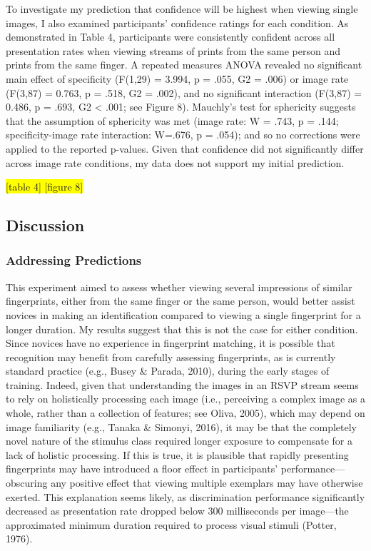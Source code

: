 \documentclass[
  english,
  man]{apa6}
\begin{document}
To investigate my prediction that confidence will be highest when viewing single images, I also examined participants' confidence ratings for each condition. As demonstrated in Table 4, participants were consistently confident across all presentation rates when viewing streams of prints from the same person and prints from the same finger. A repeated measures ANOVA revealed no significant main effect of specificity (F(1,29) = 3.994, p = .055, G2 = .006) or image rate (F(3,87) = 0.763, p = .518, G2 = .002), and no significant interaction (F(3,87) = 0.486, p = .693, G2 \textless{} .001; see Figure 8). Mauchly's test for sphericity suggests that the assumption of sphericity was met (image rate: W = .743, p = .144; specificity-image rate interaction: W=.676, p = .054); and so no corrections were applied to the reported p-values. Given that confidence did not significantly differ across image rate conditions, my data does not support my initial prediction.

\colorbox{yellow}{[table 4]
[figure 8]}

\hypertarget{discussion-1}{%
\subsection{Discussion}\label{discussion-1}}

\hypertarget{addressing-predictions-1}{%
\subsubsection{Addressing Predictions}\label{addressing-predictions-1}}

This experiment aimed to assess whether viewing several impressions of similar fingerprints, either from the same finger or the same person, would better assist novices in making an identification compared to viewing a single fingerprint for a longer duration. My results suggest that this is not the case for either condition. Since novices have no experience in fingerprint matching, it is possible that recognition may benefit from carefully assessing fingerprints, as is currently standard practice (e.g., Busey \& Parada, 2010), during the early stages of training. Indeed, given that understanding the images in an RSVP stream seems to rely on holistically processing each image (i.e., perceiving a complex image as a whole, rather than a collection of features; see Oliva, 2005), which may depend on image familiarity (e.g., Tanaka \& Simonyi, 2016), it may be that the completely novel nature of the stimulus class required longer exposure to compensate for a lack of holistic processing. If this is true, it is plausible that rapidly presenting fingerprints may have introduced a floor effect in participants' performance---obscuring any positive effect that viewing multiple exemplars may have otherwise exerted. This explanation seems likely, as discrimination performance significantly decreased as presentation rate dropped below 300 milliseconds per image---the approximated minimum duration required to process visual stimuli (Potter, 1976).
\end{document}
